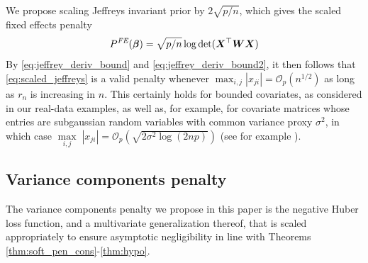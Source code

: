 \documentclass[11pt, a4paper]{article}
\newcommand*{\bb}{\boldsymbol}
\newcommand{\Op}[1]{\ensuremath{{\mathcal{O}_p(#1)}}}
\theoremstyle{example} \newtheorem{example}{Example}[section]
\theoremstyle{theorem} \newtheorem{theorem}{Theorem}[section]
\def\det{{\mathop{\rm det}}}
\def\bbeta{\bb{\beta}}
\def\bX{\bb{X}}
\def\bW {\bb{W}}
\begin{document}
 We propose scaling Jeffreys invariant prior by $ 2 \sqrt{p/n} $, which gives the scaled fixed effects penalty 
\begin{equation}\label{eq:scaled_jeffreys}
	P^{\textit{FE}}(\bbeta) = \sqrt{p/n} \log \det(\bX^\top \bW \bX)
\end{equation}
By \eqref{eq:jeffrey_deriv_bound} and \eqref{eq:jeffrey_deriv_bound2}, it then follows that \eqref{eq:scaled_jeffreys} is a valid penalty whenever $\max_{i,j} |x_{ji} | = \Op{n^{1/2}}$ as long as $r_n$ is increasing in $n$. This certainly holds for bounded covariates, as considered in our real-data examples, as well as, for example, for covariate matrices whose entries are subgaussian random variables with common variance proxy $\sigma^2$, in which case $ \underset{i,j}{\max}\;  |x_{ji} | = \Op{\sqrt{2\sigma^2 \log(2np)}}$ (see for example \citet[Theorem 1.14]{rigollet:2015}). 

\subsection{Variance components penalty}
\label{sec:glmm_re_pen}
The variance components penalty we propose in this paper is the negative Huber loss function, and a multivariate generalization thereof, that is scaled appropriately to ensure asymptotic negligibility in line with Theorems \ref{thm:soft_pen_cons}-\ref{thm:hypo}. 
\end{document}
